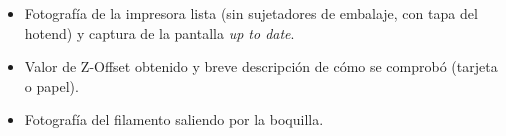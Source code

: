 \begin{entregabox}
\begin{itemize}
    \item Fotografía de la impresora lista (sin sujetadores de embalaje, con tapa del hotend) y captura de la pantalla \emph{up to date}.
    \item Valor de Z-Offset obtenido y breve descripción de cómo se comprobó (tarjeta o papel).
    \item Fotografía del filamento saliendo por la boquilla.
\end{itemize}
\end{entregabox}
